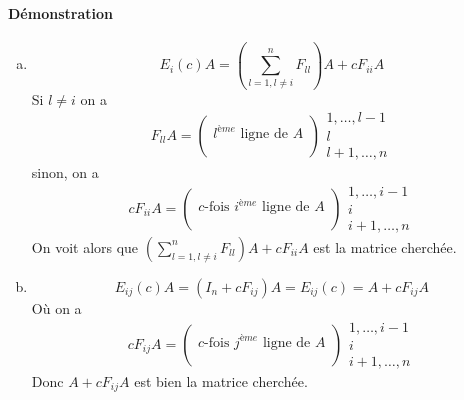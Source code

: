 \paragraph{Démonstration}
\begin{enumerate}[a)]
  \item $$E_i(c) A = \left( \sum_{l=1, l\neq i}^n F_{ll} \right) A +  c F_{ii} A$$
    Si $l\neq i$ on a
    $$F_{ll} A =
      \begin{pmatrix} 
        \\ l^{ème} \text{ ligne de } A \\ \\
      \end{pmatrix} 
      \begin{array}{c} 
        1, \ldots, l-1 \\ l \\ l+1, \ldots, n 
      \end{array}$$
    sinon, on a
    $$c F_{ii} A =
      \begin{pmatrix}
        \\ c\text{-fois } i^{ème} \text{ ligne de } A \\ \\
      \end{pmatrix} 
      \begin{array}{c} 
        1, \ldots, i-1 \\ i \\ i+1, \ldots, n 
      \end{array}$$
    On voit alors que $\left( \sum_{l=1, l\neq i}^n F_{ll} \right) A +  c F_{ii} A$ est la matrice cherchée.
    
  \item $$E_{ij}(c) A = (I_n + c F_{ij}) A = E_{ij}(c) = A + c F_{ij} A$$
    Où on a
      $$c F_{ij} A =
        \begin{pmatrix}
          \\ c\text{-fois } j^{ème} \text{ ligne de } A \\ \\
        \end{pmatrix} 
        \begin{array}{c} 
          1, \ldots, i-1 \\ i \\ i+1, \ldots, n 
        \end{array}$$
    Donc $A + c F_{ij} A$ est bien la matrice cherchée.
    

\end{enumerate}
